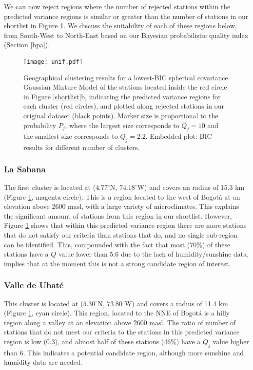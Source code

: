 \documentclass[12pt]{iopart}
\begin{document}
We can now reject regions where the number of rejected stations within the predicted variance regions is similar or greater than the number of stations in our shortlist in Figure \ref{unif}.  We discuss the suitability of each of these regions below, from South-West to North-East based on our Bayesian probabilistic quality index (Section \ref{bpa}).



\begin{figure}
\begin{center}
\texttt{[image: unif.pdf]}
\caption{Geographical clustering results  for a lowest-BIC spherical covariance Gaussian Mixture Model of the stations located inside the red circle in Figure \ref{shortlist}b, indicating the predicted variance regions for each cluster (red circles), and plotted along rejected stations in our original dataset (black points). Marker size is proportional to the probability $P_j$, where the largest size corresponds to  $Q_j=10$ and the smallest size corresponds to $Q_j=2.2$. Embedded plot: BIC results for different number of clusters. }\label{unif}
\end{center}
\end{figure}


\subsubsection{La Sabana}

The first cluster is located at ($4.77^\circ$N, $74.18^\circ$W) and covers an radius of 15.3 km (Figure \ref{unif}, magenta circle). This is a region located to the west of Bogot\'a at an elevation above 2600 masl, with a large variety of microclimates. This explains the significant amount of stations from this region in our shortlist. However, Figure \ref{unif} shows that within this predicted variance region there are more stations that do not satisfy our criteria than stations that do, and no single sub-region can be identified. This, compounded with the fact that most (70\%) of these stations have a $Q$ value lower than 5.6 due to the lack of humidity/sunshine data, implies that at the moment this is not a strong candidate region of interest.


\subsubsection{Valle de Ubat\'e}

This cluster is located at ($5.30^\circ$N, $73.80^\circ$W) and covers a radius of 11.4 km (Figure \ref{unif}, cyan circle). This region, located to the NNE of Bogot\'a is a hilly region along a valley at an elevation above 2600 masl. The ratio of number of stations that do not meet our criteria to the stations in this predicted variance region is low (0.3), and almost half of these stations (46\%) have a $Q_j$ value higher than 6. This indicates a potential candidate region, although more  sunshine and humidity data are needed.
\end{document}
